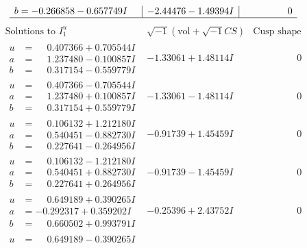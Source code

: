 \documentclass[1p]{elsarticle_modified}
\theoremstyle{definition}
\newcommand{\I}{\sqrt{-1}}
\begin{document}
$$\begin{array}{c|c|c}
\begin{aligned}
b &= -0.266858 - 0.657749 I\end{aligned}
 & -2.44476 - 1.49394 I & \phantom{-0.000000 } 0\\
 \hline 
 \end{array}$$\newpage$$\begin{array}{c|c|c}  
\text{Solutions to }I^u_{1}& \I (\text{vol} + \sqrt{-1}CS) & \text{Cusp shape}\\
 \hline 
\begin{aligned}
u &= \phantom{-}0.407366 + 0.705544 I \\
a &= \phantom{-}1.237480 - 0.100857 I \\
b &= \phantom{-}0.317154 - 0.559779 I\end{aligned}
 & -1.33061 + 1.48114 I & \phantom{-0.000000 } 0 \\ \hline\begin{aligned}
u &= \phantom{-}0.407366 - 0.705544 I \\
a &= \phantom{-}1.237480 + 0.100857 I \\
b &= \phantom{-}0.317154 + 0.559779 I\end{aligned}
 & -1.33061 - 1.48114 I & \phantom{-0.000000 } 0 \\ \hline\begin{aligned}
u &= \phantom{-}0.106132 + 1.212180 I \\
a &= \phantom{-}0.540451 - 0.882730 I \\
b &= \phantom{-}0.227641 - 0.264956 I\end{aligned}
 & -0.91739 + 1.45459 I & \phantom{-0.000000 } 0 \\ \hline\begin{aligned}
u &= \phantom{-}0.106132 - 1.212180 I \\
a &= \phantom{-}0.540451 + 0.882730 I \\
b &= \phantom{-}0.227641 + 0.264956 I\end{aligned}
 & -0.91739 - 1.45459 I & \phantom{-0.000000 } 0 \\ \hline\begin{aligned}
u &= \phantom{-}0.649189 + 0.390265 I \\
a &= -0.292317 + 0.359202 I \\
b &= \phantom{-}0.660502 + 0.993791 I\end{aligned}
 & -0.25396 + 2.43752 I & \phantom{-0.000000 } 0 \\ \hline\begin{aligned}
u &= \phantom{-}0.649189 - 0.390265 I \\

\end{aligned}
\end{array}$$
\end{document}

